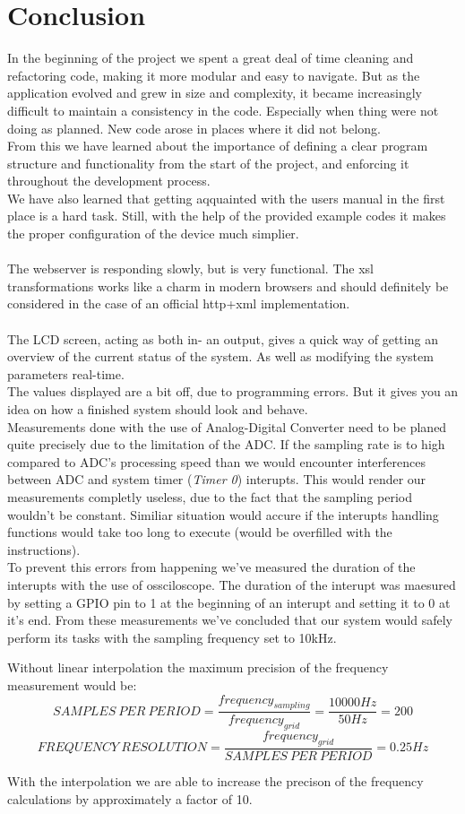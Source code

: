 \chapter{Conclusion}
\label{chap:conclusion}
In the beginning of the project we spent a great deal of time cleaning and refactoring code, making it more modular and easy to navigate. But as the application evolved and grew in size and complexity, it became increasingly difficult to maintain a consistency in the code. Especially when thing were not doing as planned. New code arose in places where it did not belong.\\
From this we have learned about the importance of defining a clear program structure and functionality from the start of the project, and enforcing it throughout the development process.\\
We have also learned that getting aqquainted with the users manual in the first place is a hard task. Still, with the help of the provided example codes it makes the proper configuration of the device much simplier.  \\\\
The webserver is responding slowly, but is very functional. The xsl transformations works like a charm in modern browsers and should definitely be considered in the case of an official http+xml implementation.\\\\
The LCD screen, acting as both in- an output, gives a quick way of getting an overview of the current status of the system. As well as modifying the system parameters real-time.\\ The values displayed are a bit off, due to programming errors. But it gives you an idea on how a finished system should look and behave.\\


Measurements done with the use of Analog-Digital Converter need to be planed quite precisely due to the limitation of the ADC. If the sampling rate is to high compared to ADC's processing speed than we would encounter interferences between ADC and system timer (\textit{Timer 0}) interupts. This would render our measurements completly useless, due to the fact that the sampling period wouldn't be constant.  Similiar situation would accure if the interupts handling functions would take too long to execute (would be overfilled with the instructions).\\ To prevent this errors from happening we've measured the duration of the interupts with the use of ossciloscope. The duration of the interupt was maesured by setting a GPIO pin to 1 at the beginning of an interupt and setting it to 0 at it's end. From these measurements we've concluded that our system would safely perform its tasks with the sampling frequency set to 10kHz.

Without linear interpolation the maximum precision of the frequency measurement would be:
\[ SAMPLES\ PER\ PERIOD=\dfrac{frequency_{sampling}}{frequency_{grid}} = \dfrac{10000Hz}{50Hz}=200 \]
\[ FREQUENCY\ RESOLUTION=\dfrac{frequency_{grid}}{SAMPLES\ PER\ PERIOD} = 0.25Hz \]

With the interpolation we are able to increase the precison of the frequency calculations by approximately a factor of 10.


